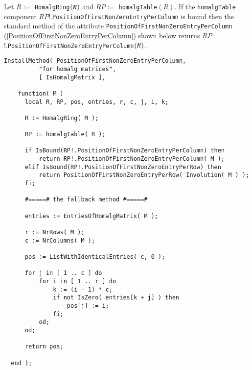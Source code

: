 \documentclass[a4paper,11pt]{report}
\begin{document}
{{{ Let $R :=$ \texttt{HomalgRing}$( \mbox{\texttt{\mdseries\slshape M}} )$ and $RP :=$ \texttt{homalgTable}$( R )$. If the \texttt{homalgTable} component $RP$!.\texttt{PositionOfFirstNonZeroEntryPerColumn} is bound then the standard method of the attribute \texttt{PositionOfFirstNonZeroEntryPerColumn} (\ref{PositionOfFirstNonZeroEntryPerColumn}) shown below returns $RP$!.\texttt{PositionOfFirstNonZeroEntryPerColumn}$( \mbox{\texttt{\mdseries\slshape M}} )$. 
\begin{Verbatim}[fontsize=\small,frame=single,label=Code]
  InstallMethod( PositionOfFirstNonZeroEntryPerColumn,
          "for homalg matrices",
          [ IsHomalgMatrix ],
          
    function( M )
      local R, RP, pos, entries, r, c, j, i, k;
      
      R := HomalgRing( M );
      
      RP := homalgTable( R );
      
      if IsBound(RP!.PositionOfFirstNonZeroEntryPerColumn) then
          return RP!.PositionOfFirstNonZeroEntryPerColumn( M );
      elif IsBound(RP!.PositionOfFirstNonZeroEntryPerRow) then
          return PositionOfFirstNonZeroEntryPerRow( Involution( M ) );
      fi;
      
      #=====# the fallback method #=====#
      
      entries := EntriesOfHomalgMatrix( M );
      
      r := NrRows( M );
      c := NrColumns( M );
      
      pos := ListWithIdenticalEntries( c, 0 );
      
      for j in [ 1 .. c ] do
          for i in [ 1 .. r ] do
              k := (i - 1) * c;
              if not IsZero( entries[k + j] ) then
                  pos[j] := i;
              fi;
          od;
      od;
      
      return pos;
      
  end );
\end{Verbatim}
 }

 }

  }
\end{document}
